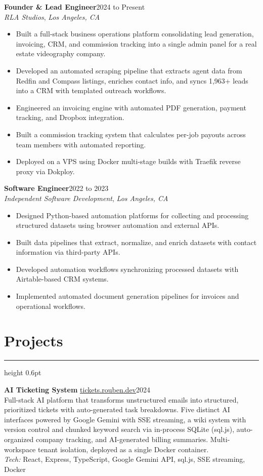 \documentclass[10pt,letterpaper]{article}
\newcommand{\resheading}[1]{%
  \section*{#1}
  \vspace{-0.4em}\hrule height 0.6pt \vspace{0.45em}
}
\newcommand{\roleline}[4]{%
  {\bfseries #1}\hfill #2\\
  {\itshape #3}\if\relax\detokenize{#4}\relax\else, {\itshape #4}\fi\\
}
\begin{document}
\vspace{0.2em}
\roleline{Founder \& Lead Engineer}{2024 to Present}{RLA Studios}{Los Angeles, CA}
\begin{itemize}
    \item Built a full-stack business operations platform consolidating lead generation, invoicing, CRM, and commission tracking into a single admin panel for a real estate videography company.
    \item Developed an automated scraping pipeline that extracts agent data from Redfin and Compass listings, enriches contact info, and syncs 1,963+ leads into a CRM with templated outreach workflows.
    \item Engineered an invoicing engine with automated PDF generation, payment tracking, and Dropbox integration.
    \item Built a commission tracking system that calculates per-job payouts across team members with automated reporting.
    \item Deployed on a VPS using Docker multi-stage builds with Traefik reverse proxy via Dokploy.
\end{itemize}

\vspace{0.2em}
\roleline{Software Engineer}{2022 to 2023}{Independent Software Development}{Los Angeles, CA}
\begin{itemize}
    \item Designed Python-based automation platforms for collecting and processing structured datasets using browser automation and external APIs.
    \item Built data pipelines that extract, normalize, and enrich datasets with contact information via third-party APIs.
    \item Developed automation workflows synchronizing processed datasets with Airtable-based CRM systems.
    \item Implemented automated document generation pipelines for invoices and operational workflows.
\end{itemize}

\resheading{Projects}

\textbf{AI Ticketing System} \textbullet{} \href{https://tickets.rouben.dev}{tickets.rouben.dev}\hfill 2024\\
Full-stack AI platform that transforms unstructured emails into structured, prioritized tickets with auto-generated task breakdowns. Five distinct AI interfaces powered by Google Gemini with SSE streaming, a wiki system with version control and chunked keyword search via in-process SQLite (sql.js), auto-organized company tracking, and AI-generated billing summaries. Multi-workspace tenant isolation, deployed as a single Docker container.\\
\textit{Tech:} React, Express, TypeScript, Google Gemini API, sql.js, SSE streaming, Docker
\end{document}
